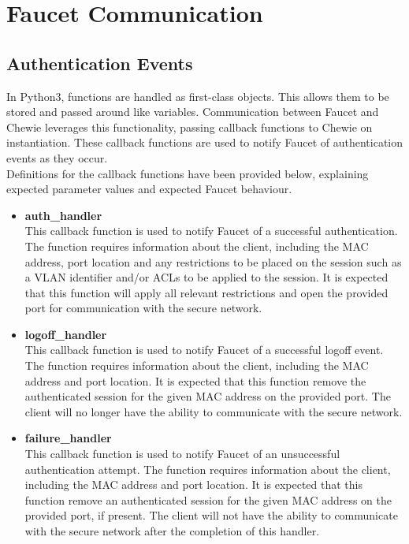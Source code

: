 \section{Faucet Communication}
\subsection{Authentication Events}
In Python3, functions are handled as first-class objects. This allows them to be stored and passed around like variables. Communication between Faucet and Chewie leverages this functionality, passing callback functions to Chewie on instantiation. These callback functions are used to notify Faucet of authentication events as they occur.\\
Definitions for the callback functions have been provided below, explaining expected parameter values and expected Faucet behaviour.
\begin{itemize}
    \item \textbf{auth\_handler}\\
    This callback function is used to notify Faucet of a successful authentication. The function requires information about the client, including the MAC address, port location and any restrictions to be placed on the session such as a VLAN identifier and/or ACLs to be applied to the session. It is expected that this function will apply all relevant restrictions and open the provided port for communication with the secure network.
    
    \item \textbf{logoff\_handler}\\
    This callback function is used to notify Faucet of a successful logoff event. The function requires information about the client, including the MAC address and port location. It is expected that this function remove the authenticated session for the given MAC address on the provided port. The client will no longer have the ability to communicate with the secure network.
    
    \item \textbf{failure\_handler}\\
    This callback function is used to notify Faucet of an unsuccessful authentication attempt. The function requires information about the client, including the MAC address and port location. It is expected that this function remove an authenticated session for the given MAC address on the provided port, if present. The client will not have the ability to communicate with the secure network after the completion of this handler.
\end{itemize}

